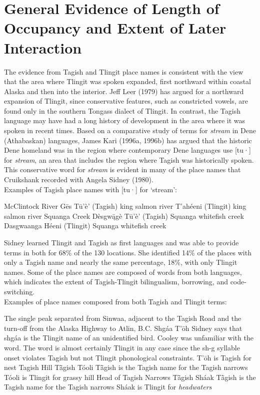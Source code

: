 \section{General Evidence of Length of Occupancy and Extent of Later Interaction}

The evidence from Tagish and Tlingit place names is consistent with the view that the area where Tlingit was spoken expanded, first northward within coastal Alaska and then into the interior.  Jeff Leer (1979) has argued for a northward expansion of Tlingit, since conservative features, such as constricted vowels, are found only in the southern Tongass dialect of Tlingit. In contrast, the Tagish language may have had a long history of development in the area where it was spoken in recent times. Based on a comparative study of terms for \textit{stream} in Dene (Athabaskan) languages, James Kari (1996a, 1996b) has argued that the historic Dene homeland was in the region where contemporary Dene languages use [tu·] for \textit{stream}, an area that includes the region where Tagish was historically spoken. This conservative word for \textit{stream} is evident in many of the place names that Cruikshank recorded with Angela Sidney (1980).\\

 Examples of Tagish place names with [tu·] for ‘stream’:
\begin{exe}

	McClintock River
\sn Gēs Tū’è’ (Tagish)		king salmon river
\sn T’ahéeni (Tlingit) 		king salmon river
 	Squanga Creek
\sn 	Dèsgwą̄gè Tū’è’ (Tagish)	Squanga whitefish creek
\sn 	Dasgwaanga Héeni (Tlingit)	Squanga whitefish creek
\end{exe}

Sidney learned Tlingit and Tagish as first languages and was able to provide terms in both for 68\% of the 130 locations. She identified 14\% of the places with only a Tagish name and nearly the same percentage, 18\%, with only Tlingit names. Some of the place names are composed of words from both languages, which indicates the extent of Tagish-Tlingit bilingualism, borrowing, and code-switching.\\

Examples of place names composed from both Tagish and Tlingit terms:
\begin{exe}
	The single peak separated from Sinwaa, adjacent to the Tagish Road and the
turn-off from the Alaska Highway to Atlin, B.C.
	\sn Shgáa	T’ōh		Sidney says that shgáa is the Tlingit name of an
unidentified bird. Cooley was unfamiliar with the word.
The word is almost certainly Tlingit in any case since the sh-g syllable onset violates Tagish but not Tlingit phonological constraints.
T’ōh is Tagish for nest
 	Tagish Hill
\sn Tā̀gish Tóoli		Tā̀gish is the Tagish name for the Tagish narrows
	\sn		Tóoli is Tlingit for grassy hill
 Head of Tagish Narrows
\sn Tā̀gish Sháak		Tā̀gish is the Tagish name for the Tagish narrows
\sn				Sháak is Tlingit for \textit{headwaters}
\end{exe}


